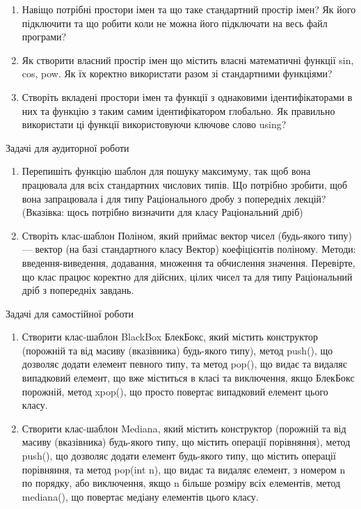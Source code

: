 \documentclass[]{article}
\makeatletter
\newcommand{\xslalph}[1]{\expandafter\@xslalph\csname c@#1\endcsname}
\newcommand{\@xslalph}[1]{%
    \ifcase#1\or а\or б\or в\or г\or д\or e\or є\or ж\or з\or i%
    \or й\or к\or л\or м\or н\or о\or п\or р\or с\or т%
    \or у\or ф\or х\or ц\or ч\or ш\or ю\or я\or аа\or бб\or вв%
    \else\@ctrerr\fi%
}
\makeatother
\begin{document}
\begin{enumerate}
\begin{enumerate}[label=\xslalph*)]
\begin{enumerate}
\begin{enumerate}[label=\xslalph*)]
\begin{enumerate}
\def\labelenumi{\arabic{enumi})}
\item
  Навіщо потрібні простори імен та що таке стандартний простір імен? Як
  його підключити та що робити коли не можна його підключати на весь
  файл програми?
\item
  Як створити власний простір імен що містить власні математичні функції
  sin, cos, pow. Як їх коректно використати разом зі стандартними
  функціями?
\item
  Створіть вкладені простори імен та функції з однаковими
  ідентифікаторами в них та функцію з таким самим ідентифікатором
  глобально. Як правильно використати ці функції використовуючи ключове
  слово using?
\end{enumerate}

Задачі для аудиторної роботи

\begin{enumerate}
\def\labelenumi{\arabic{enumi})}
\item
  Перепишіть функцію шаблон для пошуку максимуму, так щоб вона працювала
  для всіх стандартних числових типів. Що потрібно зробити, щоб вона
  запрацювала і для типу Раціонального дробу з попередніх лекцій?
  (Вказівка: щось потрібно визначити для класу Раціональний дріб)
\item
  Створіть клас-шаблон Поліном, який приймає вектор чисел (будь-якого
  типу) --- вектор (на базі стандартного класу Вектор) коефіцієнтів
  поліному. Методи: введення-виведення, додавання, множення та
  обчислення значення. Перевірте, що клас працює коректно для дійсних,
  цілих чисел та для типу Раціональний дріб з попередніх завдань.
\end{enumerate}

Задачі для самостійної роботи

\begin{enumerate}
\def\labelenumi{\arabic{enumi})}
\item
  Створити клас-шаблон BlackBox БлекБокс, який містить конструктор
  (порожній та від масиву (вказівника) будь-якого типу), метод push(),
  що дозволяє додати елемент певного типу, та метод pop(), що видає та
  видаляє випадковий елемент, що вже міститься в класі та виключення,
  якщо БлекБокс порожній, метод xpop(), що просто повертає випадковий
  елемент цього класу.
\item
  Створити клас-шаблон Mediana, який містить конструктор (порожній та
  від масиву (вказівника) будь-якого типу, що містить операції
  порівняння), метод push(), що дозволяє додати елемент будь-якого типу,
  що містить операції порівняння, та метод pop(int n), що видає та
  видаляє елемент, з номером n по порядку, або виключення, якщо n більше
  розміру всіх елементів, метод mediana(), що повертає медіану елементів
  цього класу.
\end{enumerate}


\end{enumerate}
\end{enumerate}
\end{enumerate}
\end{enumerate}
\end{document}
